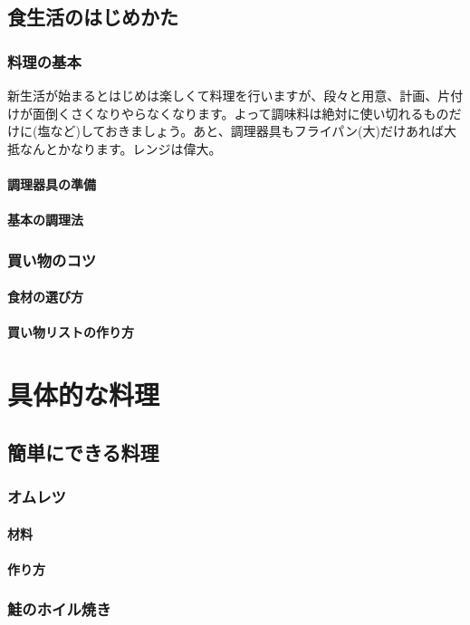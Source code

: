 \documentclass[a4j,oneside,openany]{jsbook}
\begin{document}
\chapter{食生活のはじめかた}
\section{料理の基本}
新生活が始まるとはじめは楽しくて料理を行いますが、段々と用意、計画、片付けが面倒くさくなりやらなくなります。よって調味料は絶対に使い切れるものだけに(塩など)しておきましょう。あと、調理器具もフライパン(大)だけあれば大抵なんとかなります。レンジは偉大。
\subsection{調理器具の準備}
\subsection{基本の調理法}

\section{買い物のコツ}
\subsection{食材の選び方}
\subsection{買い物リストの作り方}

\part{具体的な料理}
\chapter{簡単にできる料理}
\section{オムレツ}
\subsection{材料}
\subsection{作り方}
\section{鮭のホイル焼き}
\end{document}
